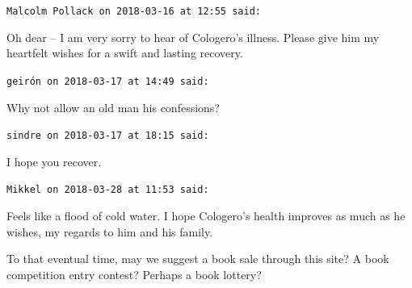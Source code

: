 \begin{footnotesize}
\begin{sffamily}
\hfill

\texttt{Malcolm Pollack on 2018-03-16 at 12:55 said:}

Oh dear -- I am very sorry to hear of Cologero's illness. Please give him my heartfelt wishes for a swift and lasting recovery.

\hfill

\texttt{geirón on 2018-03-17 at 14:49 said:}

Why not allow an old man his confessions?

\hfill

\texttt{sindre on 2018-03-17 at 18:15 said:}

I hope you recover.

\hfill

\texttt{Mikkel on 2018-03-28 at 11:53 said:}

Feels like a flood of cold water. I hope Cologero's health improves as much as he wishes, my regards to him and his family.

To that eventual time, may we suggest a book sale through this site? A book competition entry contest? Perhaps a book lottery?

\end{sffamily}
\end{footnotesize}

